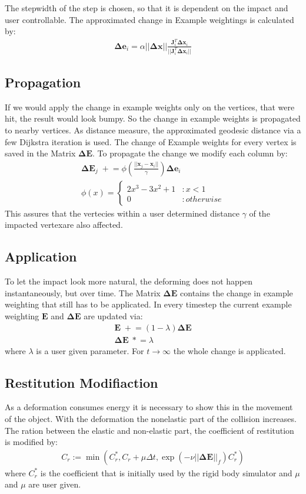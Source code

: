 The stepwidth of the step is chosen, so that it is dependent on the impact and user controllable.
The approximated change in Example weightings is calculated by:
\begin{align}
\bm{\Delta e}_i = \alpha ||\bm{\Delta x}|| \frac{\bm J_i^T \bm{\Delta x}_i}{||\bm J_i^T \bm{\Delta x}_i||}
\end{align}

\subsection{Propagation}
If we would apply the change in example weights only on the vertices, that were hit, the result would look bumpy. So the change in example weights is propagated to nearby vertices. As distance measure, the approximated geodesic distance via a few Dijkstra iteration is used. The change of Example weights for every vertex is saved in the Matrix $\bm{\Delta E}$. To propagate the change we modify each column by:
\begin{align}
\bm{\Delta E}_j \;+\!\!= \phi\left(\frac{||\bm x_j - \bm x_i||}{\gamma}\right) \bm{\Delta e}_i\\
\phi(x) =
\begin{cases}
	2x^3 - 3x^2 + 1 & : x< 1\\
	0               & : otherwise	
\end{cases}
\end{align}
This assures that the vertecies within a user determined distance $\gamma$ of the impacted vertexare also affected.
\subsection{Application}
To let the impact look more natural, the deforming does not happen instantaneously, but over time.
The Matrix $\bm{\Delta E}$ contains the change in example weighting that still has to be applicated. In every timestep the current example weighting $\bm E$ and $\bm{\Delta E}$ are updated via:
\begin{align}
\bm E \;+\!\!= (1-\lambda)\bm{\Delta E} \\
\bm {\Delta E} \;*\!\!= \lambda
\end{align}
where $\lambda$ is a user given parameter. For $t\rightarrow\infty$ the whole change is applicated.
\subsection{Restitution Modifiaction}
As a deformation consumes energy it is necessary to show this in the movement of the object. With the deformation the nonelastic part of the collision increases. The ration between the elastic and non-elastic part, the coefficient of restitution is modified by:
\begin{align}
C_r := \min(C_r^*, C_r + \mu \Delta t, \exp(-\nu||\bm{\Delta E}||_f)C_r^*)
\end{align}
where $C_r^*$ is the coefficient that is initially used by the rigid body simulator and $\mu$ and $\mu$ are user given.

